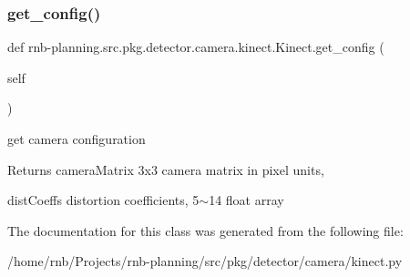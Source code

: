 \subsubsection{\texorpdfstring{get\+\_\+config()}{get\_config()}}
{\footnotesize\ttfamily def rnb-\/planning.\+src.\+pkg.\+detector.\+camera.\+kinect.\+Kinect.\+get\+\_\+config (\begin{DoxyParamCaption}\item[{}]{self }\end{DoxyParamCaption})}



get camera configuration 

\begin{DoxyReturn}{Returns}
camera\+Matrix 3x3 camera matrix in pixel units, 

dist\+Coeffs distortion coefficients, 5$\sim$14 float array 
\end{DoxyReturn}


The documentation for this class was generated from the following file\+:\begin{DoxyCompactItemize}
\item 
/home/rnb/\+Projects/rnb-\/planning/src/pkg/detector/camera/kinect.\+py\end{DoxyCompactItemize}
